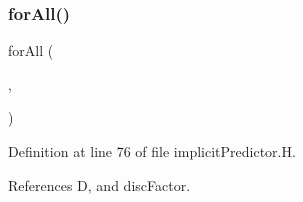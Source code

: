 \subsubsection{\texorpdfstring{for\+All()}{forAll()}\hspace{0.1cm}{\footnotesize\ttfamily [3/3]}}
{\footnotesize\ttfamily for\+All (\begin{DoxyParamCaption}\item[{flux\+\_\+}]{,  }\item[{energyI}]{ }\end{DoxyParamCaption})}



Definition at line 76 of file implicit\+Predictor.\+H.



References D, and disc\+Factor.

